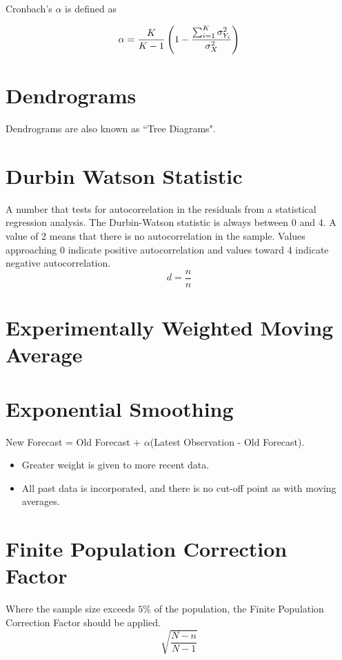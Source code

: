 Cronbach's $\alpha$ is defined as

\[
\alpha = {K \over K-1 } \left(1 - {\sum_{i=1}^K \sigma^2_{Y_i}\over \sigma^2_X}\right)
\]



\section{Dendrograms}
Dendrograms are also known as ``Tree Diagrams".
\section{Durbin Watson Statistic}

A number that tests for autocorrelation in the residuals from a statistical regression analysis. The Durbin-Watson statistic is always between 0 and 4. A value of 2 means that there is no autocorrelation in the sample. Values approaching 0 indicate positive autocorrelation and values toward 4 indicate negative autocorrelation.
\begin{equation}
d = \frac{n}{n}
\end{equation}
\section{Experimentally Weighted Moving Average}




\section{Exponential Smoothing}

New Forecast = Old Forecast + $\alpha$(Latest Observation - Old Forecast).

\begin{itemize}
	\item Greater weight is given to more recent data.
	\item All past data is incorporated, and there is no cut-off point as with moving averages.
\end{itemize}




\section{Finite Population Correction Factor}
Where the sample size exceeds $5\%$ of the population, the Finite Population Correction Factor should be applied.
\[ \sqrt{\frac{N-n}{N-1}} \]


